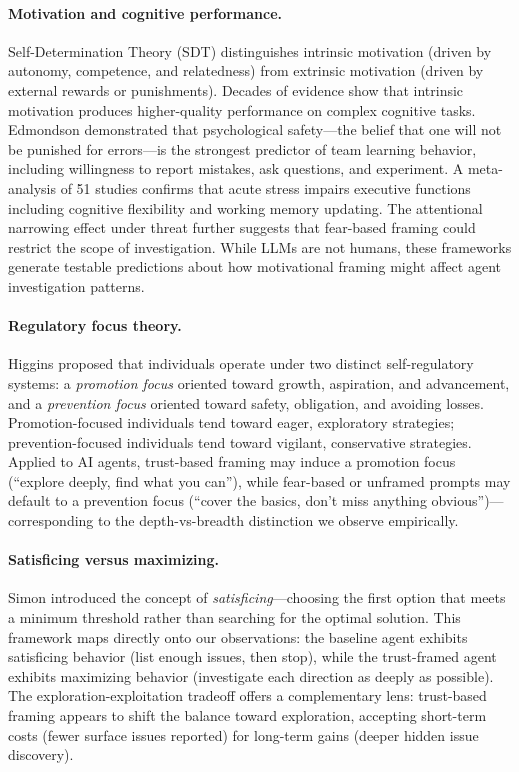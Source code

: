 \documentclass[11pt]{article}
\begin{document}
\paragraph{Motivation and cognitive performance.}
Self-Determination Theory (SDT) \cite{deci2000self,ryan2000intrinsic} distinguishes intrinsic motivation (driven by autonomy, competence, and relatedness) from extrinsic motivation (driven by external rewards or punishments). Decades of evidence show that intrinsic motivation produces higher-quality performance on complex cognitive tasks. Edmondson \cite{edmondson1999psychological} demonstrated that psychological safety---the belief that one will not be punished for errors---is the strongest predictor of team learning behavior, including willingness to report mistakes, ask questions, and experiment. A meta-analysis of 51 studies \cite{shields2016stress} confirms that acute stress impairs executive functions including cognitive flexibility and working memory updating. The attentional narrowing effect under threat \cite{easterbrook1959effect,ohman2001fears} further suggests that fear-based framing could restrict the scope of investigation. While LLMs are not humans, these frameworks generate testable predictions about how motivational framing might affect agent investigation patterns.

\paragraph{Regulatory focus theory.}
Higgins \cite{higgins1997beyond} proposed that individuals operate under two distinct self-regulatory systems: a \emph{promotion focus} oriented toward growth, aspiration, and advancement, and a \emph{prevention focus} oriented toward safety, obligation, and avoiding losses. Promotion-focused individuals tend toward eager, exploratory strategies; prevention-focused individuals tend toward vigilant, conservative strategies. Applied to AI agents, trust-based framing may induce a promotion focus (``explore deeply, find what you can''), while fear-based or unframed prompts may default to a prevention focus (``cover the basics, don't miss anything obvious'')---corresponding to the depth-vs-breadth distinction we observe empirically.

\paragraph{Satisficing versus maximizing.}
Simon \cite{simon1956rational} introduced the concept of \emph{satisficing}---choosing the first option that meets a minimum threshold rather than searching for the optimal solution. This framework maps directly onto our observations: the baseline agent exhibits satisficing behavior (list enough issues, then stop), while the trust-framed agent exhibits maximizing behavior (investigate each direction as deeply as possible). The exploration-exploitation tradeoff \cite{march1991exploration} offers a complementary lens: trust-based framing appears to shift the balance toward exploration, accepting short-term costs (fewer surface issues reported) for long-term gains (deeper hidden issue discovery).
\end{document}
